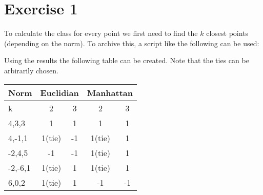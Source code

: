 \section*{Exercise 1}
To calculate the class for every point we first need to find the $k$ closest points (depending on the norm).
To archive this, a script like the following can be used:

Using the results the following table can be created. Note that the ties can be arbirarily chosen.


  \centering \begin{tabular}{l|c|c|c|c}
    Norm&\multicolumn{2}{c}{Euclidian}&\multicolumn{2}{c}{Manhattan}\\\hline
    k&2&3&2&3\\\hline
    4,3,3&1&1&1&1\\
    4,-1,1&1(tie)&-1&1(tie)&1\\
    -2,4,5&-1&-1&1(tie)&1\\
    -2,-6,1&1(tie)&1&1(tie)&1\\
    6,0,2&1(tie)&1&-1&-1
  \end{tabular}

\flushleft